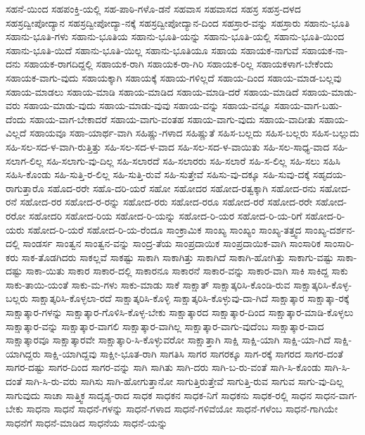 {ಸಹನೆ-ಯಿಂದ
ಸಹಪಂಕ್ತಿ-ಯಲ್ಲಿ
ಸಹ-ಪಾಠಿ-ಗಳೊ-ಡನೆ
ಸಹವಾಸ
ಸಹವಾಸದ
ಸಹಸ್ರ
ಸಹಸ್ರ-ದಳದ
ಸಹಸ್ರದ್ವೀಪೋದ್ಯಾನ
ಸಹಸ್ರದ್ವೀಪೋದ್ಯಾ-ನಕ್ಕೆ
ಸಹಸ್ರದ್ವೀಪೋದ್ಯಾನ-ದಿಂದ
ಸಹಸ್ರಾರ-ವನ್ನು
ಸಹಸ್ರಾರು
ಸಹಾನು-ಭೂತಿ
ಸಹಾನು-ಭೂತಿ-ಗಳು
ಸಹಾನು-ಭೂತಿಯ
ಸಹಾನು-ಭೂತಿ-ಯನ್ನು
ಸಹಾನು-ಭೂತಿ-ಯಲ್ಲಿ
ಸಹಾನು-ಭೂತಿ-ಯಿಂದ
ಸಹಾನು-ಭೂತಿ-ಯಿದೆ
ಸಹಾನು-ಭೂತಿ-ಯಿಲ್ಲ
ಸಹಾನು-ಭೂತಿಯೂ
ಸಹಾಯ
ಸಹಾಯಕ-ನಾಗುವೆ
ಸಹಾಯಕ-ನಾ-ದನು
ಸಹಾಯಕ-ರಾಗದಿದ್ದಲ್ಲಿ
ಸಹಾಯಕ-ರಾಗಿ
ಸಹಾಯಕ-ರಾ-ಗಿರಿ
ಸಹಾಯಕ-ರಿಲ್ಲ
ಸಹಾಯಕಳಾಗ-ಬೇಕೆಂದು
ಸಹಾಯಕ-ವಾಗು-ವುದು
ಸಹಾಯಕ್ಕಾಗಿ
ಸಹಾಯಕ್ಕೆ
ಸಹಾಯ-ಗಳಿಲ್ಲದೆ
ಸಹಾಯ-ದಿಂದ
ಸಹಾಯ-ಮಾಡ-ಬಲ್ಲವು
ಸಹಾಯ-ಮಾಡಲು
ಸಹಾಯ-ಮಾಡಿ
ಸಹಾಯ-ಮಾಡಿದ
ಸಹಾಯ-ಮಾಡಿ-ದರೆ
ಸಹಾಯ-ಮಾಡಿದೆ
ಸಹಾಯ-ಮಾಡು-ವರು
ಸಹಾಯ-ಮಾಡು-ವುದು
ಸಹಾಯ-ಮಾಡು-ವುವು
ಸಹಾಯ-ವನ್ನು
ಸಹಾಯ-ವನ್ನೂ
ಸಹಾಯ-ವಾಗ-ಬಹು-ದೆಂದು
ಸಹಾಯ-ವಾಗ-ಬೇಕಾದರೆ
ಸಹಾಯ-ವಾಗು-ವಂತಹ
ಸಹಾಯ-ವಾಗು-ವುದು
ಸಹಾಯ-ವಾದೀತು
ಸಹಾಯ-ವಿಲ್ಲದೆ
ಸಹಾಯವೂ
ಸಹಾ-ಯಾರ್ಥ-ವಾಗಿ
ಸಹಿಷ್ಣು-ಗಳಾದ
ಸಹಿಷ್ಣುತೆ
ಸಹಿಸ-ಬಲ್ಲದು
ಸಹಿಸ-ಬಲ್ಲರು
ಸಹಿಸ-ಬಲ್ಲುದು
ಸಹಿ-ಸಲ-ಸದ-ಳ-ವಾಗಿ-ರುತ್ತಿತ್ತು
ಸಹಿ-ಸಲ-ಸದ-ಳ-ವಾದ
ಸಹಿ-ಸಲ-ಸದ-ಳ-ವಾಯಿತು
ಸಹಿ-ಸಲ-ಸಾಧ್ಯ-ವಾದ
ಸಹಿ-ಸಲಾಗ-ಲಿಲ್ಲ
ಸಹಿ-ಸಲಾಗು-ವು-ದಿಲ್ಲ
ಸಹಿ-ಸಲಾರದೆ
ಸಹಿ-ಸಲಾರರು
ಸಹಿ-ಸಲಾರೆ
ಸಹಿ-ಸ-ಲಿಲ್ಲ
ಸಹಿ-ಸಲು
ಸಹಿಸಿ
ಸಹಿಸಿ-ಕೊಂಡು
ಸಹಿ-ಸುತ್ತಿ-ರ-ಲಿಲ್ಲ
ಸಹಿ-ಸುತ್ತಿ-ರುವೆ
ಸಹಿ-ಸುತ್ತೇವೆ
ಸಹಿಸು-ವು-ದಕ್ಕೂ
ಸಹಿ-ಸುವು-ದಕ್ಕೆ
ಸಹೃದಯ-ರಾಗುತ್ತಾರೊ
ಸಹೊದ-ರರೇ
ಸಹೊ-ದರಿ-ಯರೆ
ಸಹೋ
ಸಹೋದರ
ಸಹೋದ-ರತ್ವಕ್ಕಾಗಿ
ಸಹೋದ-ರನು
ಸಹೋದ-ರನೆ
ಸಹೋದ-ರರ
ಸಹೋದ-ರ-ರನ್ನು
ಸಹೋದ-ರರು
ಸಹೋದ-ರರೂ
ಸಹೋದ-ರರೆ
ಸಹೋದ-ರರೇ
ಸಹೋದ-ರರೋ
ಸಹೋದರಿ
ಸಹೋದ-ರಿಯ
ಸಹೋದ-ರಿ-ಯನ್ನು
ಸಹೋದ-ರಿ-ಯರ
ಸಹೋದ-ರಿ-ಯ-ರಿಗೆ
ಸಹೋದ-ರಿ-ಯರು
ಸಹೋದ-ರಿ-ಯರೆ
ಸಹೋದ-ರಿ-ಯ-ರೆಂದೂ
ಸಾಂಕ್ರಾಮಿಕ
ಸಾಂಖ್ಯ
ಸಾಂಖ್ಯಂ
ಸಾಂಖ್ಯ-ತತ್ತ್ವದ
ಸಾಂಖ್ಯ-ದರ್ಶನ-ದಲ್ಲಿ
ಸಾಂಡರ್ಸ
ಸಾಂತ್ವನ
ಸಾಂತ್ವನ-ವನ್ನು
ಸಾಂದ್ರ-ತೆಯ
ಸಾಂಪ್ರದಾಯಿಕ
ಸಾಂಪ್ರದಾಯಿಕ-ವಾಗಿ
ಸಾಂಸಾರಿಕ
ಸಾಂಸಾರಿ-ಕರು
ಸಾಕ-ತೊಡಗಿದರು
ಸಾಕಲ್ಲವೆ
ಸಾಕಷ್ಟು
ಸಾಕಾಗಿ
ಸಾಕಾಗಿತ್ತು
ಸಾಕಾಗಿದೆ
ಸಾಕಾಗಿ-ಹೋಗಿತ್ತು
ಸಾಕಾಗು-ವಷ್ಟು
ಸಾಕಾ-ದಷ್ಟು
ಸಾಕಾ-ಯಿತು
ಸಾಕಾರ
ಸಾಕಾರ-ದಲ್ಲಿ
ಸಾಕಾರನೂ
ಸಾಕಾರನೆ
ಸಾಕಾರ-ವನ್ನು
ಸಾಕಾರ-ವಾಗಿ
ಸಾಕಿ
ಸಾಕಿದ್ದ
ಸಾಕು
ಸಾಕು-ತಾಯಿ-ಯಂತೆ
ಸಾಕು-ಮ-ಗಳು
ಸಾಕು-ಮಾಡು
ಸಾಕೆ
ಸಾಕ್ಷಾತ್
ಸಾಕ್ಷಾತ್ಕರಿಸಿ-ಕೊಂಡಿ-ರುವ
ಸಾಕ್ಷಾತ್ಕರಿಸಿ-ಕೊಳ್ಳ-ಬಲ್ಲರು
ಸಾಕ್ಷಾತ್ಕರಿಸಿ-ಕೊಳ್ಳಲಾ-ರದೆ
ಸಾಕ್ಷಾತ್ಕರಿಸಿ-ಕೊಳ್ಳಿ
ಸಾಕ್ಷಾತ್ಕರಿಸಿ-ಕೊಳ್ಳುವು-ದಾ-ಗಿದೆ
ಸಾಕ್ಷಾತ್ಕಾರ
ಸಾಕ್ಷಾತ್ಕಾ-ರಕ್ಕೆ
ಸಾಕ್ಷಾತ್ಕಾರ-ಗಳನ್ನು
ಸಾಕ್ಷಾತ್ಕಾರ-ಗೊಳಿಸಿ-ಕೊಳ್ಳ-ಬೇಕು
ಸಾಕ್ಷಾತ್ಕಾರದ
ಸಾಕ್ಷಾತ್ಕಾರ-ದಿಂದ
ಸಾಕ್ಷಾತ್ಕಾರ-ಮಾಡಿ-ಕೊಳ್ಳಲು
ಸಾಕ್ಷಾತ್ಕಾರ-ವನ್ನು
ಸಾಕ್ಷಾತ್ಕಾರ-ವಾಗಲಿ
ಸಾಕ್ಷಾತ್ಕಾರ-ವಾಗಿಲ್ಲ
ಸಾಕ್ಷಾತ್ಕಾರ-ವಾಗು-ವುದೆಂಬ
ಸಾಕ್ಷಾತ್ಕಾರ-ವಾದ
ಸಾಕ್ಷಾತ್ಕಾರವೂ
ಸಾಕ್ಷಾತ್ಕಾರವೇ
ಸಾಕ್ಷಾತ್ಕಾರಿ-ಸಿ-ಕೊಳ್ಳುವರೋ
ಸಾಕ್ಷಾತ್ತಾಗಿ
ಸಾಕ್ಷಿ
ಸಾಕ್ಷಿ-ಯಾಗಿ
ಸಾಕ್ಷಿ-ಯಾ-ಗಿದೆ
ಸಾಕ್ಷಿ-ಯಾಗಿದ್ದರು
ಸಾಕ್ಷಿ-ಯಾಗಿದ್ದವು
ಸಾಕ್ಷೀ-ಭೂತ-ರಾಗಿ
ಸಾಗತಿಸಿ
ಸಾಗರ
ಸಾಗರಕ್ಕೂ
ಸಾಗ-ರಕ್ಕೆ
ಸಾಗರದ
ಸಾಗರ-ದಂತೆ
ಸಾಗರ-ದಷ್ಟು
ಸಾಗರ-ದಿಂದ
ಸಾಗರ-ವನ್ನು
ಸಾಗಿ
ಸಾಗಿತು
ಸಾಗಿ-ದರು
ಸಾಗಿ-ಬ-ರು-ವಂತೆ
ಸಾಗಿ-ಸಿ-ಕೊಂಡು
ಸಾಗಿ-ಸಿ-ದಂತೆ
ಸಾಗಿ-ಸಿ-ರು-ವರು
ಸಾಗಿಸು
ಸಾಗಿ-ಹೋಗುತ್ತಾನೋ
ಸಾಗುತ್ತಿರುತ್ತೇವೆ
ಸಾಗುತ್ತಿ-ರುವ
ಸಾಗುವ
ಸಾಗು-ವು-ದಿಲ್ಲ
ಸಾಗುವುದು
ಸಾಚಾ
ಸಾತ್ತ್ವಿಕ
ಸಾದೃಶ್ಯ-ರಾದ
ಸಾಧಕ
ಸಾಧಕನ
ಸಾಧಕ-ನಿಗೆ
ಸಾಧಕನು
ಸಾಧಕ-ರಲ್ಲಿ
ಸಾಧನ
ಸಾಧನ-ವಾಗ-ಬೇಕು
ಸಾಧನಾ
ಸಾಧನೆ
ಸಾಧನೆ-ಗಳನ್ನು
ಸಾಧನೆ-ಗಳಾದ
ಸಾಧನೆ-ಗಳಿವೆಯೋ
ಸಾಧನೆ-ಗಳೆಂಬ
ಸಾಧನೆ-ಗಾಗಿಯೇ
ಸಾಧನೆಗೆ
ಸಾಧನೆ-ಮಾಡಿದ
ಸಾಧನೆಯ
ಸಾಧನೆ-ಯನ್ನು
}
